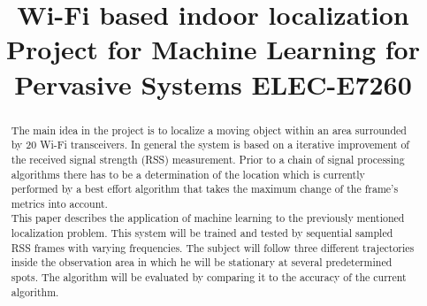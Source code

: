 \documentclass[conference]{IEEEtran}
\begin{document}
\title{Wi-Fi based indoor localization\\
{\footnotesize Project for Machine Learning for Pervasive Systems ELEC-E7260}
}

\author{
	\and
}

\maketitle

\begin{abstract}
The main idea in the project is to localize a moving object within an area surrounded by 20 Wi-Fi transceivers. In general the system is based on a iterative improvement of the received signal strength (RSS) measurement. Prior to a chain of signal processing algorithms there has to be a determination of the location which is currently performed by a best effort algorithm that takes the maximum change of the frame’s metrics into account.\\
This paper describes the application of machine learning to the previously mentioned localization problem. This system will be trained and tested by sequential sampled RSS frames with varying frequencies. The subject will follow three different trajectories inside the observation area in which he will be stationary at several predetermined spots. The algorithm will be evaluated by comparing it to the accuracy of the current algorithm.
\end{abstract}
\end{document}
